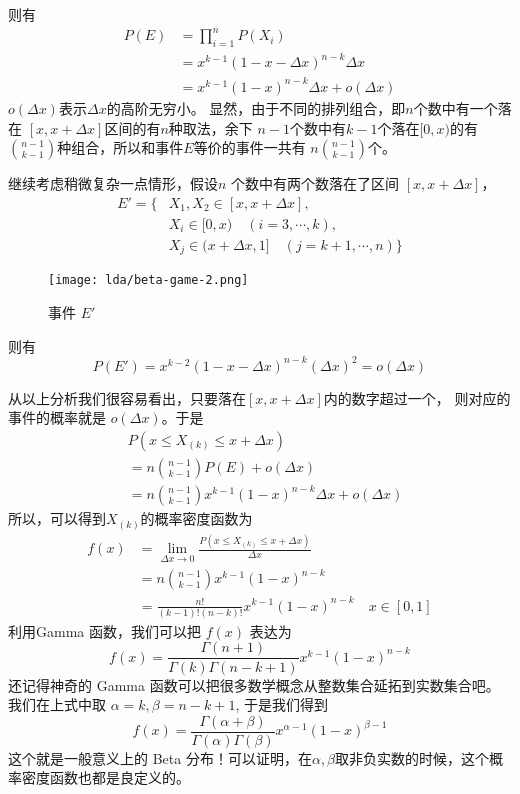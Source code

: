 则有
\begin{align*}
 P(E) & = \prod_{i=1}^nP(X_i) \\
 & = x^{k-1}(1-x-\Delta x)^{n-k}\Delta x \\
 & = x^{k-1}(1-x)^{n-k}\Delta x + o(\Delta x)
\end{align*}
$o(\Delta x)$表示$\Delta x $的高阶无穷小。
显然，由于不同的排列组合，即$n$个数中有一个落在 $[x, x+\Delta x]$区间的有$n$种取法，余下
$n-1$个数中有$k-1$个落在$[0,x)$的有$\binom{n-1}{k-1}$种组合，所以和事件$E$等价的事件一共有
$n\binom{n-1}{k-1}$个。

继续考虑稍微复杂一点情形，假设$n$ 个数中有两个数落在了区间 $[x, x+\Delta x]$，
\begin{align*}
E' = \{ & X_1,X_2\in [x, x+\Delta x], \\
& X_i \in [0,x) \quad (i=3,\cdots,k), \\
& X_j \in (x+\Delta x,1] \quad (j=k+1,\cdots,n)\}
\end{align*}
\begin{figure}[htbp]
\centering
\texttt{[image: lda/beta-game-2.png]}
\caption{事件 $E'$}
\end{figure}

则有
$$ P(E') = x^{k-2}(1-x-\Delta x)^{n-k}(\Delta x)^2 = o(\Delta x)$$

从以上分析我们很容易看出，只要落在$[x, x+\Delta x]$内的数字超过一个，
则对应的事件的概率就是 $o(\Delta x)$。于是
\begin{align*}
& P( x \le X_{(k)} \le x+\Delta x) \\
& = n\binom{n-1}{k-1}P(E) + o(\Delta x) \\
& = n\binom{n-1}{k-1}x^{k-1}(1-x)^{n-k}\Delta x +  o(\Delta x)
\end{align*}
所以，可以得到$X_{(k)}$的概率密度函数为
\begin{align*}
f(x) & = \lim_{\Delta x \rightarrow 0} \frac{P( x \le X_{(k)} \le x+\Delta x)}{\Delta x} \\
& = n\binom{n-1}{k-1}x^{k-1}(1-x)^{n-k} \\
& = \frac{n!}{(k-1)!(n-k)!}x^{k-1}(1-x)^{n-k} \quad x \in [0,1]
\end{align*}
利用Gamma 函数，我们可以把 $f(x)$ 表达为
$$ f(x) = \frac{\Gamma(n+1)}{\Gamma(k)\Gamma(n-k+1)}x^{k-1}(1-x)^{n-k} $$
还记得神奇的 Gamma 函数可以把很多数学概念从整数集合延拓到实数集合吧。我们在上式中取
$\alpha=k, \beta=n-k+1$, 于是我们得到
\begin{equation}
f(x) = \frac{\Gamma(\alpha+\beta)}{\Gamma(\alpha)\Gamma(\beta)}x^{\alpha-1}(1-x)^{\beta-1}
\end{equation}
这个就是一般意义上的 Beta 分布！可以证明，在$\alpha,\beta$取非负实数的时候，这个概率密度函数也都是良定义的。

